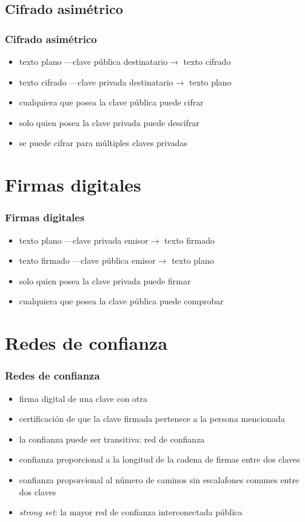 \documentclass{beamer}
\let\olditem\item
\renewcommand{\item}{%
\olditem\vspace{3pt}}
\begin{document}
\subsection{Cifrado asimétrico}
\begin{frame}
\frametitle{Cifrado asimétrico}
\begin{itemize}
    \item texto plano {\tiny ---clave pública destinatario$\rightarrow$} texto
        cifrado
    \item texto cifrado {\tiny ---clave privada destinatario$\rightarrow$} texto
        plano
    \item cualquiera que posea la clave pública puede cifrar
    \item solo quien posea la clave privada puede descifrar
    \item se puede cifrar para múltiples claves privadas
\end{itemize}
\end{frame}


\section{Firmas digitales}
\begin{frame}
\frametitle{Firmas digitales}
\begin{itemize}
    \item texto plano {\tiny ---clave privada emisor$\rightarrow$} texto firmado
    \item texto firmado {\tiny ---clave pública emisor$\rightarrow$} texto plano
    \item solo quien posea la clave privada puede firmar
    \item cualquiera que posea la clave pública puede comprobar
\end{itemize}
\end{frame}


\section{Redes de confianza}
\begin{frame}
\frametitle{Redes de confianza}
\begin{itemize}
    \item firma digital de una clave con otra
    \item certificación de que la clave firmada pertenece a la persona
        mencionada
    \item la confianza puede ser transitiva: red de confianza
    \item confianza proporcional a la longitud de la cadena de firmas entre dos
        claves
    \item confianza proporcional al número de caminos sin escalafones comunes
        entre dos claves
    \item \emph{strong set}: la mayor red de confianza interconectada pública
\end{itemize}
\end{frame}
\end{document}
